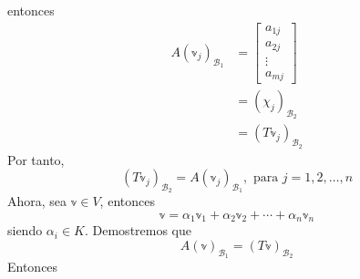 \begin{center}
\end{center}
entonces
\begin{align*}
    A(\mathbb{v}_j)_{\mathcal{B}_1} & = \begin{bmatrix}
        a_{1j} \\
        a_{2j} \\
        \vdots \\
        a_{mj}
    \end{bmatrix} \\
    & = (\chi_j)_{\mathcal{B}_2} \\
    & = (T\mathbb{v}_j)_{\mathcal{B}_2}
\end{align*}
Por tanto,
$$(T\mathbb{v}_j)_{\mathcal{B}_2} = A(\mathbb{v}_j)_{\mathcal{B}_1}, \text{ para } j = 1, 2, \dots, n$$
Ahora, sea $\mathbb{v} \in V$, entonces
$$\mathbb{v} = \alpha_1\mathbb{v}_1 + \alpha_2\mathbb{v}_2 + \cdots + \alpha_n\mathbb{v}_n$$
siendo $\alpha_i \in K$. Demostremos que
$$A(\mathbb{v})_{\mathcal{B}_1} = (T\mathbb{v})_{\mathcal{B}_2}$$
\newpage\noindent
Entonces
